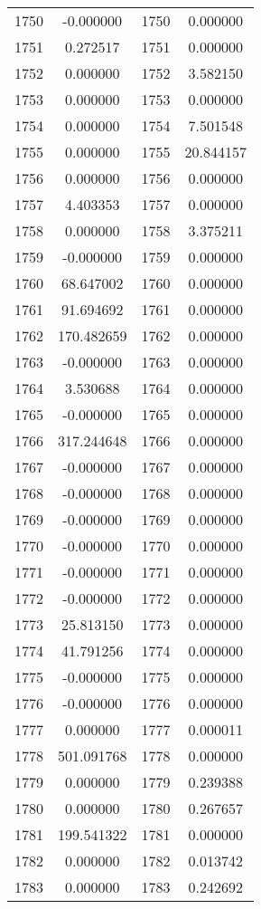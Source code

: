 \documentclass[12pt]{article}
\begin{document}
\begin{longtable}{@{}cccc@{}}
1750 & -0.000000 & 1750 & 0.000000 \\
1751 & 0.272517 & 1751 & 0.000000 \\
1752 & 0.000000 & 1752 & 3.582150 \\
1753 & 0.000000 & 1753 & 0.000000 \\
1754 & 0.000000 & 1754 & 7.501548 \\
1755 & 0.000000 & 1755 & 20.844157 \\
1756 & 0.000000 & 1756 & 0.000000 \\
1757 & 4.403353 & 1757 & 0.000000 \\
1758 & 0.000000 & 1758 & 3.375211 \\
1759 & -0.000000 & 1759 & 0.000000 \\
1760 & 68.647002 & 1760 & 0.000000 \\
1761 & 91.694692 & 1761 & 0.000000 \\
1762 & 170.482659 & 1762 & 0.000000 \\
1763 & -0.000000 & 1763 & 0.000000 \\
1764 & 3.530688 & 1764 & 0.000000 \\
1765 & -0.000000 & 1765 & 0.000000 \\
1766 & 317.244648 & 1766 & 0.000000 \\
1767 & -0.000000 & 1767 & 0.000000 \\
1768 & -0.000000 & 1768 & 0.000000 \\
1769 & -0.000000 & 1769 & 0.000000 \\
1770 & -0.000000 & 1770 & 0.000000 \\
1771 & -0.000000 & 1771 & 0.000000 \\
1772 & -0.000000 & 1772 & 0.000000 \\
1773 & 25.813150 & 1773 & 0.000000 \\
1774 & 41.791256 & 1774 & 0.000000 \\
1775 & -0.000000 & 1775 & 0.000000 \\
1776 & -0.000000 & 1776 & 0.000000 \\
1777 & 0.000000 & 1777 & 0.000011 \\
1778 & 501.091768 & 1778 & 0.000000 \\
1779 & 0.000000 & 1779 & 0.239388 \\
1780 & 0.000000 & 1780 & 0.267657 \\
1781 & 199.541322 & 1781 & 0.000000 \\
1782 & 0.000000 & 1782 & 0.013742 \\
1783 & 0.000000 & 1783 & 0.242692 \\

\end{longtable}
\end{document}
